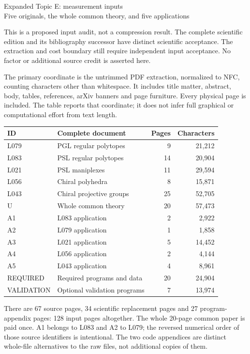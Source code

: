 \documentclass[11pt,a4paper]{article}
\begin{document}
\begin{center}{\Large Expanded Topic E: measurement inputs}\\[4pt]
Five originals, the whole common theory, and five applications\end{center}
This is a proposed input audit, not a compression result. The complete scientific edition and its bibliography successor have distinct scientific acceptance. The extraction and cost boundary still require independent input acceptance. No factor or additional source credit is asserted here.

The primary coordinate is the untrimmed PDF extraction, normalized to NFC, counting characters other than whitespace. It includes title matter, abstract, body, tables, references, arXiv banners and page furniture. Every physical page is included. The table reports that coordinate; it does not infer full graphical or computational effort from text length.
\begin{center}\small\begin{tabular}{llrr}\toprule
ID & Complete document & Pages & Characters\\\midrule
L079 & PGL regular polytopes & 9 & 21,212 \\
L083 & PSL regular polytopes & 14 & 20,904 \\
L021 & PSL maniplexes & 11 & 29,594 \\
L056 & Chiral polyhedra & 8 & 15,871 \\
L043 & Chiral projective groups & 25 & 52,705 \\
U & Whole common theory & 20 & 57,473 \\
A1 & L083 application & 2 & 2,922 \\
A2 & L079 application & 1 & 1,858 \\
A3 & L021 application & 5 & 14,452 \\
A4 & L056 application & 2 & 4,144 \\
A5 & L043 application & 4 & 8,961 \\
REQUIRED & Required programs and data & 20 & 24,904 \\
VALIDATION & Optional validation programs & 7 & 13,974 \\
\bottomrule\end{tabular}\end{center}
There are 67 source pages, 34 scientific replacement pages and 27 program-appendix pages: 128 input pages altogether. The whole 20-page common paper is paid once. A1 belongs to L083 and A2 to L079; the reversed numerical order of those source identifiers is intentional. The two code appendices are distinct whole-file alternatives to the raw files, not additional copies of them.
\end{document}

